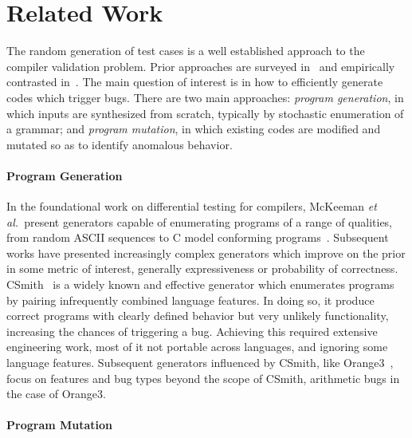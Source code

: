 \section{Related Work}\label{sec:rw}



The random generation of test cases is a well established approach to the compiler validation problem. Prior approaches are surveyed in~\cite{Kossatchev2005,Boujarwah1997} and empirically contrasted in~\cite{Chen2014a}. The main question of interest is in how to efficiently generate codes which trigger bugs. There are two main approaches: \emph{program generation}, in which inputs are synthesized from scratch, typically by stochastic enumeration of a grammar; and \emph{program mutation}, in which existing codes are modified and mutated so as to identify anomalous behavior.

\paragraph{Program Generation}

In the foundational work on differential testing for compilers, McKeeman \emph{et al.\ }present generators capable of enumerating programs of a range of qualities, from random ASCII sequences to C model conforming programs~\cite{McKeeman1998}. Subsequent works have presented increasingly complex generators which improve on the prior in some metric of interest, generally expressiveness or probability of correctness. CSmith~\cite{Yang2011} is a widely known and effective generator which enumerates programs by pairing infrequently combined language features. In doing so, it produce correct programs with clearly defined behavior but very unlikely functionality, increasing the chances of triggering a bug. Achieving this required extensive engineering work, most of it not portable across languages, and ignoring some language features. Subsequent generators influenced by CSmith, like Orange3~\cite{Nagai2013}, focus on features and bug types beyond the scope of CSmith, arithmetic bugs in the case of Orange3. 

\paragraph{Program Mutation}

